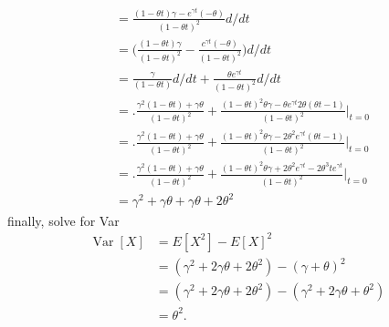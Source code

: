 \documentclass[answers]{exam}
\begin{document}
\begin{questions}
\begin{solution}
\begin{align*}
		&= \frac{(1-\theta t)\gamma-e^{\gamma t}(-\theta)}{(1-\theta t)^2} d/dt \\
		&= \bigg( \frac{(1-\theta t)\gamma}{(1-\theta t)^2} - \frac{c^{\gamma t}(-\theta)}{(1-\theta t)^2} \bigg) d/dt \\
		&= \frac{\gamma}{(1-\theta t)}d/dt + \frac{\theta e^{\gamma t}}{(1-\theta t)^2} d/dt \\
		&= \bigg. \frac{\gamma^2(1-\theta t)+\gamma\theta}{(1-\theta t)^2} + 
			\frac{(1-\theta t)^2\theta\gamma -
				\theta e^{\gamma t}2\theta(\theta t-1)   }{(1-\theta t)^2} \bigg|_{t=0} \\
		&= \bigg. \frac{\gamma^2(1-\theta t)+\gamma\theta}{(1-\theta t)^2} + 
			\frac{(1-\theta t)^2\theta\gamma -
				2\theta^2 e^{\gamma t}(\theta t-1)   }{(1-\theta t)^2} \bigg|_{t=0} \\
		&= \bigg. \frac{\gamma^2(1-\theta t)+\gamma\theta}{(1-\theta t)^2} + 
		\frac{(1-\theta t)^2\theta\gamma +
			2\theta^2 e^{\gamma t}-2\theta^3 te^{\gamma t}   }{(1-\theta t)^2} \bigg|_{t=0} \\
		&= \gamma^2 +\gamma\theta + \gamma\theta + 2\theta^2
	\end{align*}
	finally, solve for Var
	\begin{align*}
		\operatorname{Var}[X]
		&= E[X^2] - E[X]^2 \\
		&= (\gamma^2 + 2\gamma\theta +2\theta^2)-(\gamma+\theta)^2 \\
		&= (\gamma^2 + 2\gamma\theta +2\theta^2)-(\gamma^2+2\gamma\theta+\theta^2) \\
		&= \theta^2.
	\end{align*}
\end{solution}
	

\end{questions}
\end{document}
